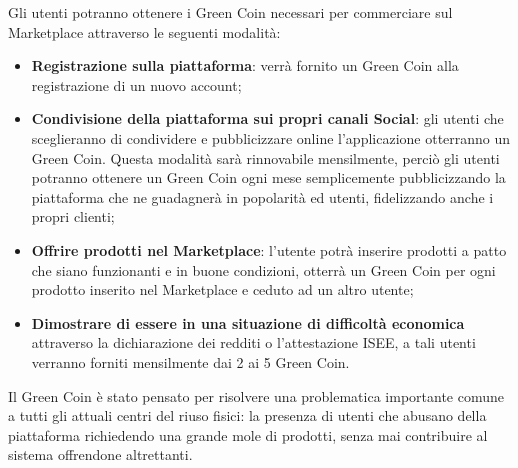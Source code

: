 Gli utenti potranno ottenere i Green Coin necessari per commerciare sul Marketplace attraverso le seguenti modalità:
\begin{itemize}
    \item \textbf{Registrazione sulla piattaforma}: verrà fornito un Green Coin alla registrazione di un nuovo account;
    \item \textbf{Condivisione della piattaforma sui propri canali Social}: gli utenti che sceglieranno di condividere e pubblicizzare online l'applicazione otterranno un Green Coin. Questa modalità sarà rinnovabile mensilmente, perciò gli utenti potranno ottenere un Green Coin ogni mese semplicemente pubblicizzando la piattaforma che ne guadagnerà in popolarità ed utenti, fidelizzando anche i propri clienti; 
    \item \textbf{Offrire prodotti nel Marketplace}: l'utente potrà inserire prodotti a patto che siano funzionanti e in buone condizioni, otterrà un Green Coin per ogni prodotto inserito nel Marketplace e ceduto ad un altro utente;
    \item \textbf{Dimostrare di essere in una situazione di difficoltà economica} attraverso la dichiarazione dei redditi o l'attestazione ISEE, a tali utenti verranno forniti mensilmente dai 2 ai 5 Green Coin.
\end{itemize}
Il Green Coin è stato pensato per risolvere una problematica importante comune a tutti gli attuali centri del riuso fisici: la presenza di utenti che abusano della piattaforma richiedendo una grande mole di prodotti, senza mai contribuire al sistema offrendone altrettanti. 
\medskip

